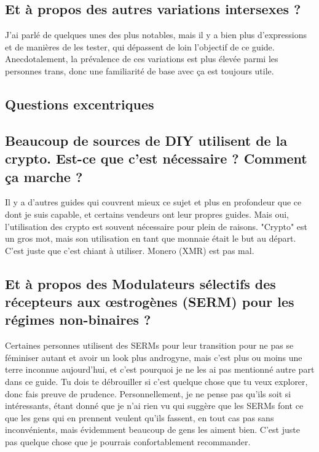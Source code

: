 \documentclass{article}
\begin{document}
\subsection{Et à propos des autres variations intersexes ?}

J'ai parlé de quelques unes des plus notables, mais il y a bien plus d'expressions et de manières de les tester, qui dépassent de loin l'objectif de ce guide. Anecdotalement, la prévalence de ces variations est plus élevée parmi les personnes trans, donc une familiarité de base avec ça est toujours utile.

\subsection*{Questions excentriques}

\subsection{Beaucoup de sources de DIY utilisent de la crypto. Est-ce que c'est nécessaire ? Comment ça marche ?}

Il y a d'autres guides qui couvrent mieux ce sujet et plus en profondeur que ce dont je suis capable, et certains vendeurs ont leur propres guides. Mais oui, l'utilisation des crypto est souvent nécessaire pour plein de raisons. "Crypto" est un gros mot, mais son utilisation en tant que monnaie était le but au départ. C'est juste que c'est chiant à utiliser. Monero (XMR) est pas mal. 

\subsection{Et à propos des Modulateurs sélectifs des récepteurs aux œstrogènes (SERM) pour les régimes non-binaires ?}

Certaines personnes utilisent des SERMs pour leur transition pour ne pas se féminiser autant et avoir un look plus androgyne, mais c'est plus ou moins une terre inconnue aujourd'hui, et c'est pourquoi je ne les ai pas mentionné autre part dans ce guide. Tu dois te débrouiller si c'est quelque chose que tu veux explorer, donc fais preuve de prudence. Personnellement, je ne pense pas qu'ils soit si intéressants, étant donné que je n'ai rien vu qui suggère que les SERMs font ce que les gens qui en prennent veulent qu'ils fassent, en tout cas pas sans inconvénients, mais évidemment beaucoup de gens les aiment bien. C'est juste pas quelque chose que je pourrais confortablement recommander.
\end{document}
